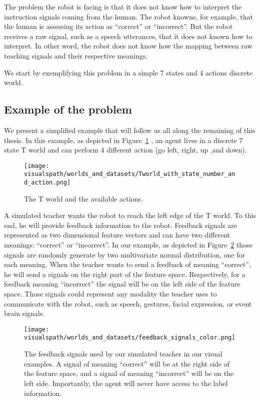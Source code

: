 The problem the robot is facing is that it does not know how to interpret the instruction signals coming from the human. The robot knowns, for example, that the human is assessing its action as ``correct'' or ``incorrect''. But the robot receives a raw signal, such as a speech utterances, that it does not known how to interpret. In other word, the robot does not know how the mapping between raw teaching signals and their respective meanings.

We start by exemplifying this problem in a simple 7 states and 4 actions discrete world.

\subsection{Example of the problem}
\label{chapter:lfui:example}

We present a simplified example that will follow us all along the remaining of this thesis. In this example, as depicted in Figure~\ref{fig:Tworld} , an agent lives in a discrete 7 state T world and can perform 4 different action (go left, right, up ,and down).

\begin{figure}[!ht]
  \centering
  \texttt{[image: \\visualspath/worlds\_and\_datasets/Tworld\_with\_state\_number\_and\_action.png]}
  \caption{The T world and the available actions.}
  \label{fig:Tworld}
\end{figure}

A simulated teacher wants the robot to reach the left edge of the T world. To this end, he will provide feedback information to the robot. Feedback signals are represented as two dimensional feature vectors and can have two different meanings: ``correct'' or ``incorrect''. In our example, as depicted in Figure~\ref{fig:feedbacksignals} those signals are randomly generate by two multivariate normal distribution, one for each meaning. When the teacher wants to send a feedback of meaning ``correct'', he will send a signals on the right part of the feature space. Respectively, for a feedback meaning ``incorrect'' the signal will be on the left side of the feature space. Those signals could represent any modality the teacher uses to communicate with the robot, such as speech, gestures, facial expression, or event brain signals. 

\begin{figure}[!ht]
  \centering
  \texttt{[image: \\visualspath/worlds\_and\_datasets/feedback\_signals\_color.png]}
  \caption{The feedback signals used by our simulated teacher in our visual examples. A signal of meaning ``correct'' will be at the right side of the feature space, and a signal of meaning ``incorrect'' will be on the left side. Importantly, the agent will never have access to the label information.}
  \label{fig:feedbacksignals}
\end{figure}

